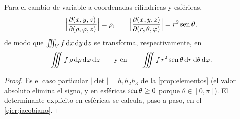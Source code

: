 \begin{proposicion}[Jacobianos]\label{prop:jacobianos}
Para el cambio de variable a coordenadas cilíndricas y esféricas,
\[
  \Bigl|\frac{\partial(x,y,z)}{\partial(\rho,\varphi,z)}\Bigr|=\rho,
  \qquad
  \Bigl|\frac{\partial(x,y,z)}{\partial(r,\theta,\varphi)}\Bigr|=r^{2}\operatorname{sen}\theta,
\]
de modo que $\iiint_Vf\,\mathrm{d} x\,\mathrm{d} y\,\mathrm{d} z$ se transforma, respectivamente, en
\[
  \iiint f\,\rho\,\mathrm{d}\rho\,\mathrm{d}\varphi\,\mathrm{d} z
  \qquad\text{y en}\qquad
  \iiint f\,r^{2}\operatorname{sen}\theta\,\mathrm{d} r\,\mathrm{d}\theta\,\mathrm{d}\varphi .
\]
\end{proposicion}
\begin{proof}
Es el caso particular $|\det|=h_1h_2h_3$ de la \cref{prop:elementos} (el
valor absoluto elimina el signo, y en esféricas $\operatorname{sen}\theta\ge0$ porque
$\theta\in[0,\pi]$). El determinante explícito en esféricas se calcula, paso a
paso, en el \cref{ejer:jacobiano}.
\end{proof}
